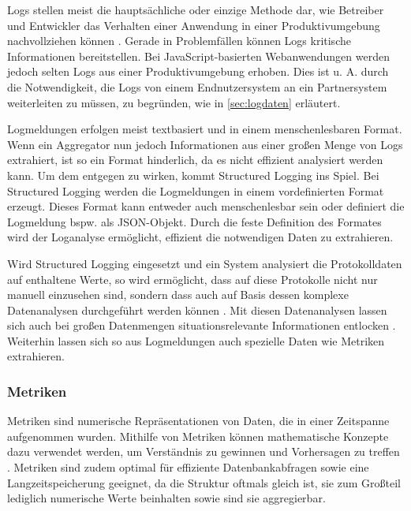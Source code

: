 Logs stellen meist die hauptsächliche oder einzige Methode dar, wie Betreiber und Entwickler das Verhalten einer Anwendung in einer Produktivumgebung nachvollziehen können \cite{EventLogsForTheAnalysisOfSoftwareFailures} \cite{LearningToLog}. Gerade in Problemfällen können Logs kritische Informationen bereitstellen. Bei JavaScript-basierten Webanwendungen werden jedoch selten Logs aus einer Produktivumgebung erhoben. Dies ist u. A. durch die Notwendigkeit, die Logs von einem Endnutzersystem an ein Partnersystem weiterleiten zu müssen, zu begründen, wie in \autoref{sec:logdaten} erläutert.

Logmeldungen erfolgen meist textbasiert und in einem menschenlesbaren Format. Wenn ein Aggregator nun jedoch Informationen aus einer großen Menge von Logs extrahiert, ist so ein Format hinderlich, da es nicht effizient analysiert werden kann. Um dem entgegen zu wirken, kommt Structured Logging ins Spiel. Bei Structured Logging \cite{StructuredAndInteroperableLogging} werden die Logmeldungen in einem vordefinierten Format erzeugt. Dieses Format kann entweder auch menschenlesbar sein oder definiert die Logmeldung bspw. als JSON-Objekt. Durch die feste Definition des Formates wird der Loganalyse ermöglicht, effizient die notwendigen Daten zu extrahieren.

Wird Structured Logging eingesetzt und ein System analysiert die Protokolldaten auf enthaltene Werte, so wird ermöglicht, dass auf diese Protokolle nicht nur manuell einzusehen sind, sondern dass auch auf Basis dessen komplexe Datenanalysen durchgeführt werden können \cite{StructuredAndInteroperableLogging}. Mit diesen Datenanalysen lassen sich auch bei großen Datenmengen situationsrelevante Informationen entlocken \cite{StructuredLoggingCraftingUsefulMessageContent}. Weiterhin lassen sich so aus Logmeldungen auch spezielle Daten wie Metriken extrahieren.

\subsubsection{Metriken}

Metriken sind numerische Repräsentationen von Daten, die in einer Zeitspanne aufgenommen wurden. Mithilfe von Metriken können mathematische Konzepte dazu verwendet werden, um Verständnis zu gewinnen und Vorhersagen zu treffen \cite{DistributedSystemsObservability}. Metriken sind zudem optimal für effiziente Datenbankabfragen sowie eine Langzeitspeicherung geeignet, da die Struktur oftmals gleich ist, sie zum Großteil lediglich numerische Werte beinhalten sowie sind sie aggregierbar.


